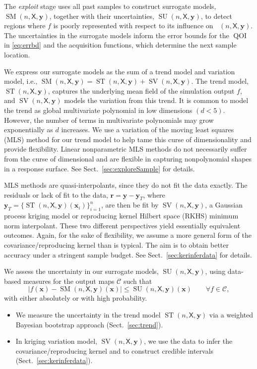 \documentclass[11pt]{NSFamsart}
\DeclareMathOperator{\QOI}{QOI} %
\DeclareMathOperator{\APP}{\widehat{\QOI}}
\DeclareMathOperator{\SURR}{SM} %
\DeclareMathOperator{\STREND}{ST} %
\DeclareMathOperator{\SVAR}{SV} %
\newcommand{\MLS}{\textrm{MLS}\xspace} %
\DeclareMathOperator{\SURRERR}{SU}
\newcommand{\mX}{\mathsf{X}}
\newcommand{\bx}{{\boldsymbol{x}}}
\newcommand{\br}{{\boldsymbol{r}}}
\newcommand{\by}{{\boldsymbol{y}}}
\newcommand{\calc}{{\mathcal{C}}}
\def\abs#1{\ensuremath{\left \lvert #1 \right \rvert}}
\newif\ifnotesw \noteswtrue
\newcommand{\notes}[1]{\ifnotesw \textcolor{red}{  $\clubsuit$\ {\sf \bf \it  #1}\ $\clubsuit$  }\fi}
\begin{document}
The \emph{exploit} stage uses all past samples to construct surrogate models, $\SURR(n,\mX,\by)$, together with their uncertainties, $\SURRERR(n,\mX,\by)$, to detect regions where $f$ is poorly represented with respect to its influence on $\APP(n,\mX,\by)$.  The uncertainties in the surrogate models inform the error bounds for the $\QOI$ in \eqref{eq:errbd} and the acquisition functions, which determine the next sample location.

We express our surrogate models as the sum of a trend model and  variation model, i.e., $\SURR(n,\mX,\by) = \STREND(n,\mX,\by) + \SVAR(n,\mX,\by)$. 
The trend model, $\STREND(n,\mX,\by)$, captures the underlying mean field of the simulation output $f$,  and  $\SVAR(n,\mX,\by)$ models the variation from this trend. 
It is common to model the trend as global multivariate polynomial in low dimensions $(d<5)$. 
However, the number of terms in multivariate polynomials may grow exponentially as $d$ increases.  We use  
a variation of the moving least squares (\MLS) method \cite{liumovingpartI1997, limovingpartII1996, salehi2013generalized, mederos2003moving} for our trend model to help tame this curse of dimensionality and provide flexibility.  Linear nonparametric \MLS methods do not necessarily suffer from the curse of dimensional and are flexible in capturing nonpolynomial shapes in a response surface.  
See Sect.\ \ref{sec:exploreSample} for details.  

\MLS methods are quasi-interpolants, since they do not fit the data exactly.  
The residuals or lack of fit to the data, $\br = \by - \by_T$, where $\by_T = \{ \STREND(n,\mX,\by)(\bx_i) \}_{i=1}^n$, are then be fit by $\SVAR(n,\mX,\by)$, a Gaussian process kriging model or reproducing kernel Hilbert space (RKHS) minimum norm interpolant.  These two different perspectives yield essentially equivalent outcomes.  Again, for the sake of flexibility, we assume a more general form of the covariance/reproducing kernel than is typical.  The aim is to obtain better accuracy under a stringent sample budget. See Sect.\ \ref{sec:kerinferdata} for details.  

We assess the uncertainty in  our surrogate models, $\SURRERR(n,\mX,\by)$, using data-based measures for the output maps $\calc$ such that 
\begin{equation} \label{eq:surrUncert}
    \abs{f(\bx)-\SURR(n,\mX,\by)(\bx)} \le \SURRERR(n,\mX,\by)(\bx) \qquad \forall f \in \calc,
\end{equation}
with either absolutely or with high probability.
\begin{itemize}
\item We measure the uncertainty in the trend model $\STREND(n,\mX,\by) $ via a weighted Bayesian bootstrap approach (Sect.\ \ref{sec:trend}). 
\item In kriging variation model,  $\SVAR(n,\mX,\by)$, we use the data to infer the  covariance/reproducing kernel and to construct credible intervals (Sect.\ \ref{sec:kerinferdata}).
\end{itemize}
\end{document}
